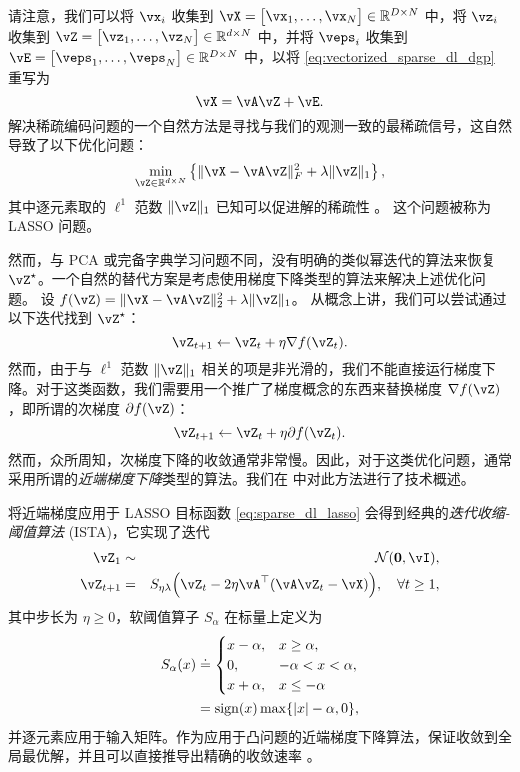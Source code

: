 \documentclass[../../book-main_zh.tex]{subfiles}
\begin{document}
请注意，我们可以将 \(\vx_{i}\) 收集到 \(\vX = \mat{\vx_{1}, \dots, \vx_{N}} \in \R^{D \times N}\) 中，将 \(\vz_{i}\) 收集到 \(\vZ = \mat{\vz_{1}, \dots, \vz_{N}} \in \R^{d  \times N}\) 中，并将 \(\veps_{i}\) 收集到 \(\vE = \mat{\veps_{1}, \dots, \veps_{N}} \in \R^{D \times N}\) 中，以将 \eqref{eq:vectorized_sparse_dl_dgp} 重写为
\begin{equation}\label{eq:sparse_dl_dgp}
    \vX = \vA\vZ + \vE.
\end{equation}
解决稀疏编码问题的一个自然方法是寻找与我们的观测一致的最稀疏信号，这自然导致了以下优化问题：
\begin{equation}\label{eq:sparse_dl_lasso}
    \min_{\vZ \in \R^{d \times N}}\bc{\norm{\vX - \vA\vZ}_{F}^{2} + \lambda \norm{\vZ}_{1}},
\end{equation}
其中逐元素取的 \(\ell^1\) 范数 \(\norm{\vZ}_{1}\) 已知可以促进解的稀疏性 \cite{Wright-Ma-2022}。
这个问题被称为 LASSO 问题。

然而，与 PCA 或完备字典学习问题不同，没有明确的类似幂迭代的算法来恢复 \(\vZ^{\star}\)。一个自然的替代方案是考虑使用梯度下降类型的算法来解决上述优化问题。
设 \(f(\vZ) = \norm{\vX - \vA\vZ}_{2}^{2} + \lambda \norm{\vZ}_{1}\)。
从概念上讲，我们可以尝试通过以下迭代找到 \(\vZ^{\star}\)：
\begin{equation}
    \vZ_{t+1} \leftarrow \vZ_t + \eta \nabla f(\vZ_t).
\end{equation}
然而，由于与 \(\ell^1\) 范数 \(\norm{\vZ}_{1}\) 相关的项是非光滑的，我们不能直接运行梯度下降。对于这类函数，我们需要用一个推广了梯度概念的东西来替换梯度 \(\nabla f(\vZ)\)，即所谓的次梯度 \(\partial f(\vZ)\)：
\begin{equation}
    \vZ_{t+1} \leftarrow \vZ_t + \eta \partial f(\vZ_t).
\end{equation}
然而，众所周知，次梯度下降的收敛通常非常慢。因此，对于这类优化问题，通常采用所谓的\textit{近端梯度下降}类型的算法。我们在  中对此方法进行了技术概述。

将近端梯度应用于 LASSO 目标函数 \eqref{eq:sparse_dl_lasso} 会得到经典的\textit{迭代收缩-阈值算法} (ISTA)，它实现了迭代
\begin{eqnarray}
    \vZ_{1} &\sim& \dNorm(\vzero, \vI), \\
    \vZ_{t + 1} &=& S_{\eta\lambda}\rp{\vZ_{t} - 2\eta \vA^{\top}(\vA\vZ_{t} - \vX)}, \quad \forall t \geq 1,\label{eq:ista_update}
\end{eqnarray}
其中步长为 \(\eta \geq 0\)，软阈值算子 \(S_{\alpha}\) 在标量上定义为
\begin{align}
    S_{\alpha}(x) &
    \doteq \begin{cases}x - \alpha, & x \geq \alpha, \\ 0,
    & -\alpha < x < \alpha, \\ x + \alpha, & x \leq -\alpha\end{cases}
    \\
    &=
    \sign(x) \max \set{\abs{x} - \alpha, 0},
\end{align}
并逐元素应用于输入矩阵。作为应用于凸问题的近端梯度下降算法，保证收敛到全局最优解，并且可以直接推导出精确的收敛速率 \cite{Wright-Ma-2022}。
\end{document}
